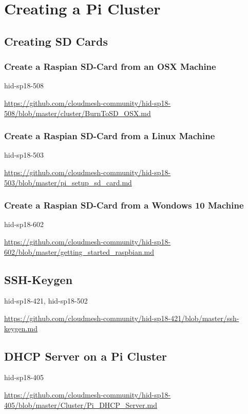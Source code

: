 \chapter{Creating a Pi Cluster}

\section{Creating SD Cards}

\subsection{Create a Raspian SD-Card from an OSX Machine}

hid-sp18-508

\url{https://github.com/cloudmesh-community/hid-sp18-508/blob/master/cluster/BurnToSD_OSX.md}


\subsection{Create a Raspian SD-Card from a Linux Machine}

hid-sp18-503 

\url{https://github.com/cloudmesh-community/hid-sp18-503/blob/master/pi_setup_sd_card.md}

\subsection{Create a Raspian SD-Card from a Wondows 10 Machine}

hid-sp18-602

\url{https://github.com/cloudmesh-community/hid-sp18-602/blob/master/getting_started_raspbian.md}


\section{SSH-Keygen}

hid-sp18-421, hid-sp18-502

\url{https://github.com/cloudmesh-community/hid-sp18-421/blob/master/ssh-keygen.md}

\section{DHCP Server on a Pi Cluster}

hid-sp18-405 

\url{https://github.com/cloudmesh-community/hid-sp18-405/blob/master/Cluster/Pi_DHCP_Server.md}



